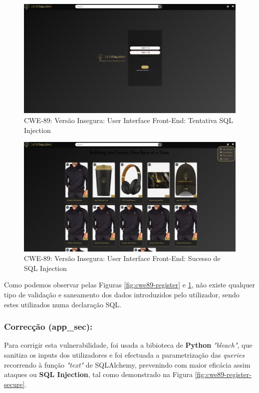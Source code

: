 \begin{figure}[H]
  \centering
  \includegraphics[width=16cm]{images/CWE-89-Inject.png}
  \caption{CWE-89: Versão Insegura: User Interface Front-End: Tentativa SQL Injection}
  \label{fig:cwe89-inject}
\end{figure}

\begin{figure}[H]
  \centering
  \includegraphics[width=16cm]{images/CWE-89-Sucess.png}
  \caption{CWE-89: Versão Insegura: User Interface Front-End: Sucesso de SQL Injection}
  \label{fig:cwe89-sucess}
\end{figure}

Como podemos observar pelas Figuras \ref{fig:cwe89-register} e \ref{fig:cwe89-inject}, não existe qualquer tipo de validação e saneamento dos dados introduzidos pelo utilizador, sendo estes utilizados numa declaração SQL.

\subsubsection{Correcção (app\_sec):}

Para corrigir esta vulnerabilidade, foi usada a bibioteca de \textbf{Python} \textit{"bleach"}, que sanitiza os inputs dos utilizadores e foi efectuada a parametrização das \textit{queries} recorrendo à função \textit{"text"} de SQLAlchemy, prevenindo com maior eficácia assim ataques ou \textbf{SQL Injection}, tal como demonstrado na Figura \ref{fig:cwe89-register-secure}.\\


